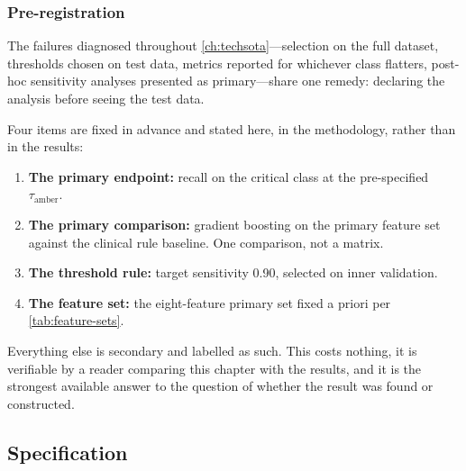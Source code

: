 \documentclass[12pt,a4paper,oneside]{report}
\begin{document}
\subsubsection{Pre-registration}\label{sec:prereg}

The failures diagnosed throughout \cref{ch:techsota}---selection on the full dataset, thresholds chosen on test data, metrics reported for whichever class flatters, post-hoc sensitivity analyses presented as primary---share one remedy: declaring the analysis before seeing the test data.

Four items are fixed in advance and stated here, in the methodology, rather than in the results:

\begin{enumerate}[nosep]
  \item \textbf{The primary endpoint:} recall on the critical class at the pre-specified $\tau_{\text{amber}}$.
  \item \textbf{The primary comparison:} gradient boosting on the primary feature set against the clinical rule baseline. One comparison, not a matrix.
  \item \textbf{The threshold rule:} target sensitivity 0.90, selected on inner validation.
  \item \textbf{The feature set:} the eight-feature primary set fixed a priori per \cref{tab:feature-sets}.
\end{enumerate}

Everything else is secondary and labelled as such. This costs nothing, it is verifiable by a reader comparing this chapter with the results, and it is the strongest available answer to the question of whether the result was found or constructed.

\subsection{Specification}\label{sec:spec34}
\end{document}
